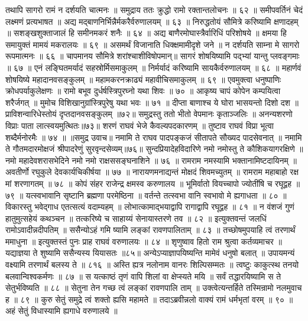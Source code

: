तथापि सागरो रामं न दर्शयति चात्मनः ॥
समुद्राय ततः क्रुद्धो रामो रक्तान्तलोचनः ॥ ६२ ॥
समीपवर्तिनं चेदं लक्ष्मणं प्रत्यभाषत ॥
अद्य मद्बाणनिर्भिन्नैर्मकरैर्वरुणालयम् ॥ ६३ ॥
निरुद्धतोयं सौमित्रे करिष्यामि क्षणादहम् ॥
सशङ्खशुक्ताजालं हि समीनमकरं शनैः ॥ ६४ ॥
अद्य बाणैरमोघास्त्रैर्वारिधिं परिशोषये ॥
क्षमया हि समायुक्तं मामयं मकरालयः ॥ ६९ ॥
असमर्थं विजानाति धिक्क्षमामीदृशे जने ॥
न दर्शयति साम्ना मे सागरो रूपमात्मनः ॥ ६६ ॥
चापमानय सौमित्रे शरांश्चाशीविषोपमान्॥
सागरं शोषयिष्यामि पद्भ्यां यान्तु प्लवङ्गमाः ॥ ६७ ॥
एनं लङ्घितमर्यादं सहस्रोर्मिसमाकुलम् ॥
निर्मर्यादं करिष्यामि सायकैर्वरुणालयम् ॥ ६८ ॥
महार्णवं शोषयिष्ये महादानवसङ्कुलम् ॥
महामकरनक्राढ्यं महावीचिसमाकुलम् ॥ ६९ ॥
एवमुक्त्वा धनुष्पाणिः क्रोधपर्याकुलेक्षणः ॥
रामो बभूव दुर्धर्षस्त्रिपुरघ्नो यथा शिवः ॥ ७० ॥
आकृष्य चापं कोपेन कम्पयित्वा शरैर्जगत् ॥
मुमोच विशिखानुग्रांस्त्रिपुरेषु यथा भवः ॥ ७१ ॥
दीप्ता बाणाश्च ये घोरा भासयन्तो दिशो दश ॥
प्राविशन्वारिधेस्तोयं दृप्तदानवसङ्कुलम् ॥७२॥
समुद्रस्तु ततो भीतो वेपमानः कृताञ्जलिः ॥
अनन्यशरणो विप्राः पाता लात्स्वयमुत्थितः॥७३॥
शरणं राघवं भेजे कैवल्यपदकारणम् ॥
तुष्टाव राघवं विप्रा भूत्वा शब्दैर्मनोरमैः ॥ ७४ ॥
॥समुद्र उवाच॥
नमामि ते राघव पादपङ्कजं सीतापते सौख्यद पादसेवनात् ॥
नमामि ते गौतमदारमोक्षजं श्रीपादरेणुं सुरवृन्दसेव्यम्॥७६॥
सुन्दप्रियादेहविदारिणे नमो नमोस्तु ते कौशिकयागरक्षिणे ॥
नमो महादेवशरासभेदिने नमो नमो राक्षससङ्घनाशिने ॥ ७६ ॥
रामराम नमस्यामि भक्तानामिष्टदायिनम् ॥
अवतीर्णो रघुकुले देवकार्यचिकीर्षया ॥ ७७ ॥
नारायणमनाद्यन्तं मोक्षदं शिवमच्युतम् ॥
रामराम महाबाहो रक्ष मां शरणागतम् ॥ ७८ ॥
कोपं संहर राजेन्द्र क्षमस्व करुणालय ॥
भूमिर्वातो वियच्चापो ज्योतींषि च रघूद्वह ॥ ७९ ॥
यत्स्वभावानि सृष्टानि ब्रह्मणा परमेष्ठिना ॥
वर्तन्ते तत्स्वभा वानि स्वभावो मे ह्यगाधता ॥ ८० ॥
विकारस्तु भवेद्गाध एतत्सत्यं वदाम्यहम् ॥
लोभात्कामाद्भयाद्वापि रागाद्वापि रघूद्वह ॥ ८१ ॥
न वंशजं गुणं हातुमुत्सहेयं कथञ्चन ॥
तत्करिष्ये च साहाय्यं सेनायास्तरणे तव ॥ ८२ ॥
इत्युक्तवन्तं जलधिं रामोऽवादीन्नदीपतिम् ॥
ससैन्योऽहं गमि ष्यामि लङ्कां रावणपालिताम् ॥ ८३ ॥
तच्छोषमुपयाहि त्वं तरणार्थं ममाधुना ॥
इत्युक्तस्तं पुनः प्राह राघवं वरुणालयः ॥ ८४ ॥
शृणुष्वाव हितो राम श्रुत्वा कर्तव्यमाचर ॥
यद्याज्ञया ते शुष्यामि ससैन्यस्य यियासतः ॥८५॥
अन्येऽप्याज्ञापयिष्यन्ति मामेवं धनुषो बलात् ॥
उपायमन्यं वक्ष्यामि तरणार्थं बलस्य ते ॥ ८१६ ॥
अस्ति ह्यत्र नलोनाम वानरः शिल्पिसम्मतः ॥
त्वष्टुः काकुत्स्थ तनयो बलवान्विश्वकर्मणः ॥ ८७ ॥
स यत्काष्ठं तृणं वापि शिलां वा क्षेप्स्यते मयि ॥
सर्वं तद्धारयिष्यामि स ते सेतुर्भविष्यति ॥ ८८ ॥
सेतुना तेन गच्छ त्वं लङ्कां रावणपालि ताम् ॥
उक्त्वेत्यन्तर्हिते तस्मिन्रामो नलमुवाच ह ॥ ८९ ॥
कुरु सेतुं समुद्रे त्वं शक्तो ह्यसि महामते ॥
तदाऽब्रवीन्नलो वाक्यं रामं धर्मभृतां वरम् ॥ ९० ॥
अहं सेतुं विधास्यामि ह्यगाधे वरुणालये ॥
